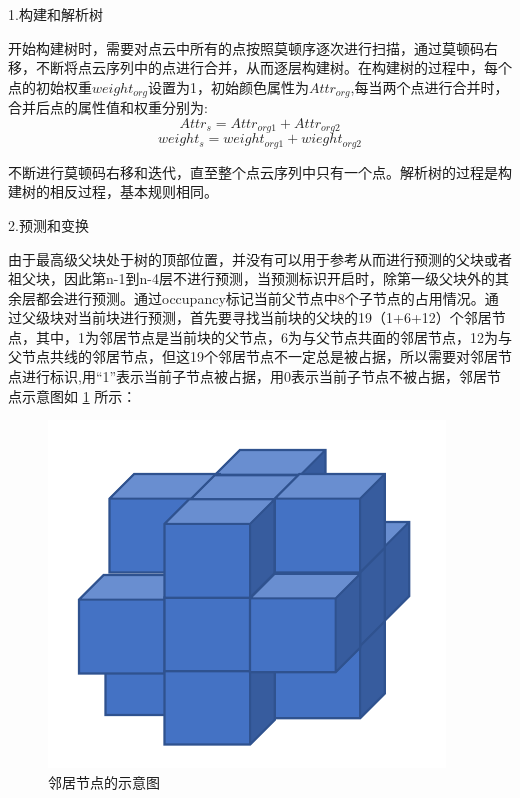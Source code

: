 \documentclass[bachelor,print,msfonts]{xduthesis}
\begin{document}
1.构建和解析树

开始构建树时，需要对点云中所有的点按照莫顿序逐次进行扫描，通过莫顿码右移，不断将点云序列中的点进行合并，从而逐层构建树。在构建树的过程中，每个点的初始权重$weight_{org}$设置为1，初始颜色属性为$Attr_{org}$,每当两个点进行合并时，合并后点的属性值和权重分别为:
\begin{equation}
    Attr_s=Attr_{org1}+Attr_{org2}
\end{equation}
\begin{equation}
    weight_s=weight_{org1}+wieght_{org2}
\end{equation}

不断进行莫顿码右移和迭代，直至整个点云序列中只有一个点。解析树的过程是构建树的相反过程，基本规则相同。

2.预测和变换

由于最高级父块处于树的顶部位置，并没有可以用于参考从而进行预测的父块或者祖父块，因此第n-1到n-4层不进行预测，当预测标识开启时，除第一级父块外的其余层都会进行预测。通过occupancy标记当前父节点中8个子节点的占用情况。通过父级块对当前块进行预测，首先要寻找当前块的父块的19（1+6+12）个邻居节点，其中，1为邻居节点是当前块的父节点，6为与父节点共面的邻居节点，12为与父节点共线的邻居节点，但这19个邻居节点不一定总是被占据，所以需要对邻居节点进行标识,用“1”表示当前子节点被占据，用0表示当前子节点不被占据，邻居节点示意图如 \ref{fig:邻居节点的示意图} 所示：
\begin{figure}[h]
    \centering
    \includegraphics[scale=0.7]{image/邻居节点示意图v2.pdf}
    \caption{邻居节点的示意图}
    \label{fig:邻居节点的示意图}
\end{figure}
\end{document}
